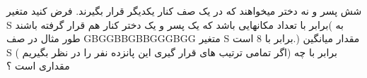 شش پسر و نه دختر میخواهند که در یک صف کنار یکدیگر قرار بگیرند. فرض کنید متغیر S برابر با تعداد مکانهایی باشد که یک پسر و یک دختر کنار هم قرار گرفته باشند( به طور مثال در صف GBGGBBGBBGGGBGG متغیر S برابر با 8 است.)
مقدار میانگین S ( اگر تمامی ترتیب های قرار گیری این پانزده نفر را در نظر بگیریم)  برابر با چه مقداری است ؟
